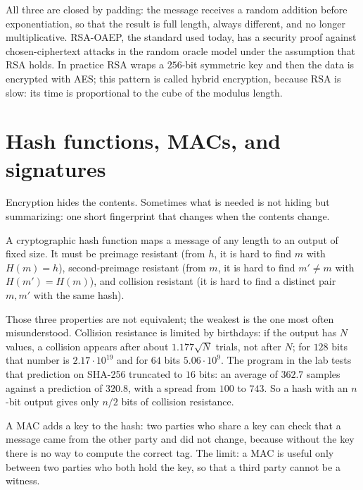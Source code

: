 All three are closed by padding: the message receives a random addition before exponentiation, so
that the result is full length, always different, and no longer multiplicative. RSA-OAEP, the
standard used today, has a security proof against chosen-ciphertext attacks in the random oracle
model under the assumption that RSA holds. In practice RSA wraps a $256$-bit symmetric key and then
the data is encrypted with AES; this pattern is called hybrid encryption, because RSA is slow: its
time is proportional to the cube of the modulus length.


\section{Hash functions, MACs, and signatures}

Encryption hides the contents. Sometimes what is needed is not hiding but summarizing: one short
fingerprint that changes when the contents change.

\begin{definisi}
A cryptographic hash function maps a message of any length to an output of fixed size. It must be
preimage resistant (from $h$, it is hard to find $m$ with $H(m)=h$), second-preimage resistant (from
$m$, it is hard to find $m'\neq m$ with $H(m')=H(m)$), and collision resistant (it is hard to find a
distinct pair $m,m'$ with the same hash).
\end{definisi}

Those three properties are not equivalent; the weakest is the one most often misunderstood. Collision
resistance is limited by birthdays: if the output has $N$ values, a collision appears after about
$1.177\sqrt N$ trials, not after $N$; for $128$ bits that number is $2.17\cdot10^{19}$ and for $64$
bits $5.06\cdot10^{9}$. The program in the lab tests that prediction on SHA-256 truncated to $16$
bits: an average of $362.7$ samples against a prediction of $320.8$, with a spread from $100$ to
$743$. So a hash with an $n$-bit output gives only $n/2$ bits of collision resistance.

A MAC adds a key to the hash: two parties who share a key can check that a message came from the
other party and did not change, because without the key there is no way to compute the correct tag.
The limit: a MAC is useful only between two parties who both hold the key, so that a third party
cannot be a witness.

